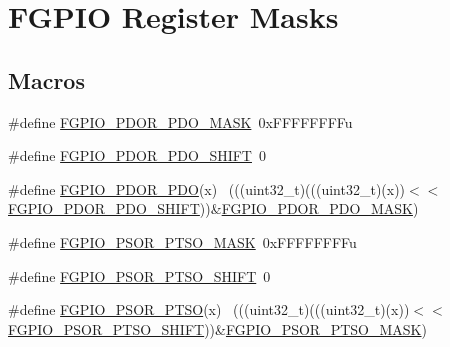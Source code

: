 \hypertarget{group___f_g_p_i_o___register___masks}{}\section{F\+G\+P\+IO Register Masks}
\label{group___f_g_p_i_o___register___masks}
\subsection*{Macros}
\begin{DoxyCompactItemize}
\item 
\#define \hyperlink{group___f_g_p_i_o___register___masks_ga36d3575737128f82053b0b713c2ba12c}{F\+G\+P\+I\+O\+\_\+\+P\+D\+O\+R\+\_\+\+P\+D\+O\+\_\+\+M\+A\+SK}~0x\+F\+F\+F\+F\+F\+F\+F\+Fu
\item 
\#define \hyperlink{group___f_g_p_i_o___register___masks_gac47066e363d078fd698fccc3e2717b7e}{F\+G\+P\+I\+O\+\_\+\+P\+D\+O\+R\+\_\+\+P\+D\+O\+\_\+\+S\+H\+I\+FT}~0
\item 
\#define \hyperlink{group___f_g_p_i_o___register___masks_gac8d543e6d04c0067728ca6b835a5df45}{F\+G\+P\+I\+O\+\_\+\+P\+D\+O\+R\+\_\+\+P\+DO}(x)                                            ~(((uint32\+\_\+t)(((uint32\+\_\+t)(x))$<$$<$\hyperlink{group___f_g_p_i_o___register___masks_gac47066e363d078fd698fccc3e2717b7e}{F\+G\+P\+I\+O\+\_\+\+P\+D\+O\+R\+\_\+\+P\+D\+O\+\_\+\+S\+H\+I\+FT}))\&\hyperlink{group___f_g_p_i_o___register___masks_ga36d3575737128f82053b0b713c2ba12c}{F\+G\+P\+I\+O\+\_\+\+P\+D\+O\+R\+\_\+\+P\+D\+O\+\_\+\+M\+A\+SK})
\item 
\#define \hyperlink{group___f_g_p_i_o___register___masks_gae9ca2771800b24b305bfa09312e2ee3e}{F\+G\+P\+I\+O\+\_\+\+P\+S\+O\+R\+\_\+\+P\+T\+S\+O\+\_\+\+M\+A\+SK}~0x\+F\+F\+F\+F\+F\+F\+F\+Fu
\item 
\#define \hyperlink{group___f_g_p_i_o___register___masks_ga8a5cd9350700e90d57dfc2d6b27f9184}{F\+G\+P\+I\+O\+\_\+\+P\+S\+O\+R\+\_\+\+P\+T\+S\+O\+\_\+\+S\+H\+I\+FT}~0
\item 
\#define \hyperlink{group___f_g_p_i_o___register___masks_gafc93f34ccf2780abefde84c2b7063365}{F\+G\+P\+I\+O\+\_\+\+P\+S\+O\+R\+\_\+\+P\+T\+SO}(x)                                          ~(((uint32\+\_\+t)(((uint32\+\_\+t)(x))$<$$<$\hyperlink{group___f_g_p_i_o___register___masks_ga8a5cd9350700e90d57dfc2d6b27f9184}{F\+G\+P\+I\+O\+\_\+\+P\+S\+O\+R\+\_\+\+P\+T\+S\+O\+\_\+\+S\+H\+I\+FT}))\&\hyperlink{group___f_g_p_i_o___register___masks_gae9ca2771800b24b305bfa09312e2ee3e}{F\+G\+P\+I\+O\+\_\+\+P\+S\+O\+R\+\_\+\+P\+T\+S\+O\+\_\+\+M\+A\+SK})

\end{DoxyCompactItemize}
